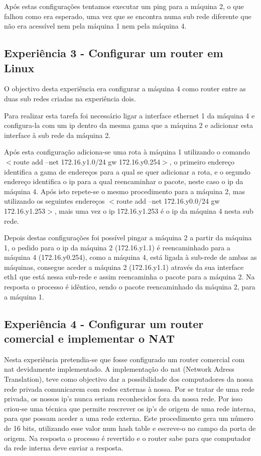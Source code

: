 \documentclass[a4paper]{article}
\begin{document}

Após estas configurações tentamos executar um ping para a máquina 2, o que falhou como era esperado, uma vez que se encontra numa sub rede diferente que não era acessível nem pela máquina 1 nem pela máquina 4.

\subsection{Experiência 3 - Configurar um router em Linux}
O objectivo desta experiência era configurar a máquina 4 como router entre as duas sub redes criadas na experiência dois.

Para realizar esta tarefa foi necessário ligar a interface ethernet 1 da máquina 4 e configura-la com um ip dentro da mesma gama que a máquina 2 e adicionar esta interface à sub rede da máquina 2.

Após esta configuração adiciona-se uma rota à máquina 1 utilizando o comando $<$route add –net  172.16.y1.0/24 gw 172.16.y0.254$>$, o primeiro endereço identifica a gama de endereços para a qual se quer adicionar a rota, e o segundo endereço identifica o ip para a qual reencaminhar o pacote, neste caso o ip da máquina 4. Após isto repete-se o mesmo procedimento para a máquina 2, mas utilizando os seguintes endereços $<$route add –net 172.16.y0.0/24 gw 172.16.y1.253$>$, mais uma vez o ip 172.16.y1.253 é o ip da máquina 4 nesta sub rede.

Depois destas configurações foi possível pingar a máquina 2 a partir da máquina 1, o pedido para o ip da máquina 2 (172.16.y1.1) é reencaminhado para a máquina 4 (172.16.y0.254), como a máquina 4, está ligada à sub-rede de ambas as máquinas, consegue aceder a máquina 2 (172.16.y1.1) através da sua interface eth1 que está nessa sub-rede e assim reencaminha o pacote para a máquina 2. Na resposta o processo é idêntico, sendo o pacote reencaminhado da máquina 2, para a máquina 1.



\subsection{Experiência 4 - Configurar um router comercial e implementar o NAT}
Nesta experiência pretendia-se que fosse configurado um router comercial com nat devidamente implementado. A implementação do nat (Network Adress Translation), teve como objectivo dar a possibilidade dos computadores da nossa rede privada comunicarem com redes externas à nossa. Por se tratar de uma rede privada, os nossos ip’s nunca seriam reconhecidos fora da nossa rede. Por isso criou-se uma técnica que permite rescrever os ip’s de origem  de uma rede interna, para que possam aceder a uma rede externa. Este procedimento gera um número de 16 bits, utilizando esse valor num hash table e escreve-o no campo da porta de origem. Na resposta o processo é revertido e o router sabe para que computador da rede interna deve enviar a resposta.
\end{document}

